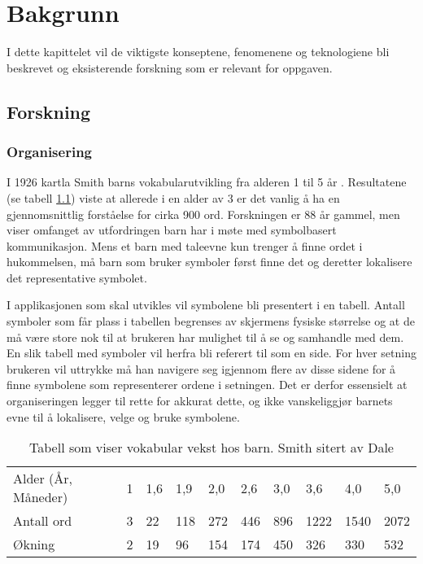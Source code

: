 
\chapter{Bakgrunn}

I dette kapittelet vil de viktigste konseptene, fenomenene og teknologiene bli beskrevet og eksisterende  forskning som er relevant for oppgaven. 



\section{Forskning}

\subsection{Organisering}


I 1926 kartla Smith\cite{Smith} barns vokabularutvikling fra alderen 1 til 5 år . Resultatene (se tabell \ref{fig:BarnVak}) viste at allerede i en alder av 3 er det vanlig å ha en gjennomsnittlig forståelse for cirka 900 ord. Forskningen er 88 år gammel, men viser omfanget av utfordringen barn har i møte med symbolbasert kommunikasjon. Mens et barn med taleevne kun trenger å finne ordet i hukommelsen, må barn som bruker symboler først finne det og deretter lokalisere det representative symbolet. 

I applikasjonen som skal utvikles vil symbolene bli presentert i en tabell. Antall symboler som får plass i tabellen begrenses av skjermens fysiske størrelse og at de må være store nok til at brukeren har mulighet til å se  og samhandle med dem. En slik tabell med symboler vil herfra bli referert til som en side. For hver setning brukeren vil uttrykke må han navigere seg igjennom flere av disse sidene for å finne symbolene som representerer ordene i setningen. Det er derfor essensielt at organiseringen legger til rette for akkurat dette, og ikke vanskeliggjør barnets evne til å lokalisere, velge og bruke symbolene.

\begin{table}[h]
\begin{tabular}{llllllllll}
\hline
Alder (År, Måneder) & 1 & 1,6 & 1,9 & 2,0 & 2,6 & 3,0 & 3,6  & 4,0  & 5,0  \\ 
Antall ord          & 3 & 22  & 118 & 272 & 446 & 896 & 1222 & 1540 & 2072 \\ 
Økning              & 2 & 19  & 96  & 154 & 174 & 450 & 326  & 330  & 532  \\ \hline
\end{tabular}
\caption{Tabell som viser vokabular vekst hos barn.  Smith \cite{Smith} sitert av Dale \cite{Dale} }
\label{fig:BarnVak}
\end{table}


